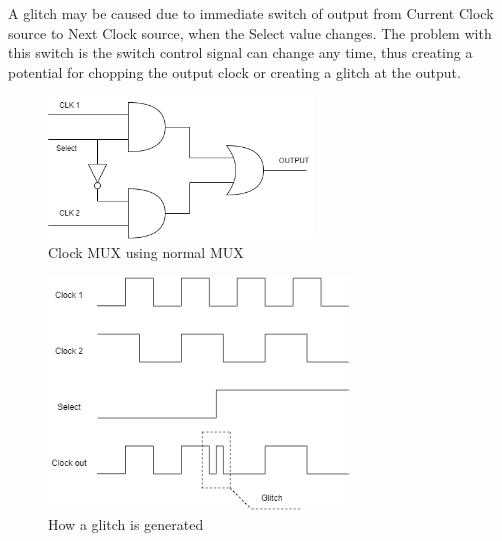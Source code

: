 \documentclass[a4paper, 12pt]{report}
\begin{document}
A glitch may be caused due to immediate switch of output from Current Clock source to Next Clock source, when the Select value changes. The problem with this switch is the switch control signal can change any time, thus creating a potential for chopping the output clock or creating a glitch at the output.

\begin{center} 
    \begin{figure}[H]
        \begin{center}
            \includegraphics[width=7cm]{picture/clock mux/clock mux-Page-2.drawio.png}
        \end{center}
        \caption{Clock MUX using normal MUX}
        \label{ref Figure}
    \end{figure}
\end{center}

\begin{center} 
    \begin{figure}[H]
        \begin{center}
            \includegraphics[width=8cm]{picture/clock mux/clock mux.drawio.png}
        \end{center}
        \caption{How a glitch is generated}
        \label{ref Figure}
    \end{figure}
\end{center}
\end{document}

